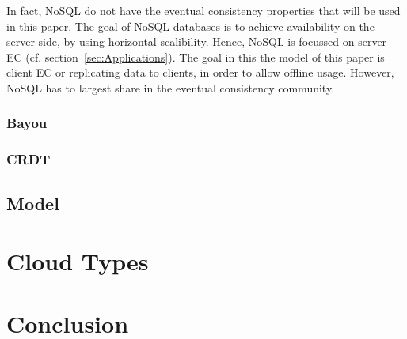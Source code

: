 \documentclass[a4paper,12pt]{report}
\begin{document}
In fact, NoSQL do not have the eventual consistency properties that will be used in this paper. The goal of NoSQL databases is to achieve availability on the server-side, by using horizontal scalibility. Hence, NoSQL is focussed on server EC (cf. section~\ref{sec:Applications}). The goal in this the model of this paper is client EC or replicating data to clients, in order to allow offline usage. However, NoSQL has to largest share in the eventual consistency community. 

\subsection{Bayou}\label{subsec:Bayou}



\subsection{CRDT}\label{subsec:CRDT}

\section{Model}\label{sec:Model}




\chapter{Cloud Types}\label{cha:CloudTypes} %
\chapter{Conclusion}\label{cha:Conclusion} %
\end{document}
